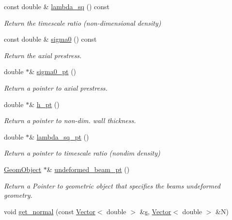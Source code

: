 \begin{DoxyCompactItemize}
const double \& \hyperlink{classoomph_1_1KirchhoffLoveBeamEquations_a8dc173db47158b04c2613b946756a74f}{lambda\+\_\+sq} () const
\begin{DoxyCompactList}\small\item\em Return the timescale ratio (non-\/dimensional density) \end{DoxyCompactList}\item 
const double \& \hyperlink{classoomph_1_1KirchhoffLoveBeamEquations_aa6d1fce06b7f030673fa5dce0f539a72}{sigma0} () const
\begin{DoxyCompactList}\small\item\em Return the axial prestress. \end{DoxyCompactList}\item 
double $\ast$\& \hyperlink{classoomph_1_1KirchhoffLoveBeamEquations_a1aa02dcbcf7a8f278100aa509a1cf4ae}{sigma0\+\_\+pt} ()
\begin{DoxyCompactList}\small\item\em Return a pointer to axial prestress. \end{DoxyCompactList}\item 
double $\ast$\& \hyperlink{classoomph_1_1KirchhoffLoveBeamEquations_a269ed76cccc247c9dfdbe0750b09db3a}{h\+\_\+pt} ()
\begin{DoxyCompactList}\small\item\em Return a pointer to non-\/dim. wall thickness. \end{DoxyCompactList}\item 
double $\ast$\& \hyperlink{classoomph_1_1KirchhoffLoveBeamEquations_a82ef550c7f4237fda4561dee0b20712a}{lambda\+\_\+sq\+\_\+pt} ()
\begin{DoxyCompactList}\small\item\em Return a pointer to timescale ratio (nondim density) \end{DoxyCompactList}\item 
\hyperlink{classoomph_1_1GeomObject}{Geom\+Object} $\ast$\& \hyperlink{classoomph_1_1KirchhoffLoveBeamEquations_ade277069089bd27531bf47caea1cb827}{undeformed\+\_\+beam\+\_\+pt} ()
\begin{DoxyCompactList}\small\item\em Return a Pointer to geometric object that specifies the beam\textquotesingle{}s undeformed geometry. \end{DoxyCompactList}\item 
void \hyperlink{classoomph_1_1KirchhoffLoveBeamEquations_a963a2ffb3c4008e3b9c175fc1d2d94cc}{get\+\_\+normal} (const \hyperlink{classoomph_1_1Vector}{Vector}$<$ double $>$ \&\hyperlink{cfortran_8h_ab7123126e4885ef647dd9c6e3807a21c}{s}, \hyperlink{classoomph_1_1Vector}{Vector}$<$ double $>$ \&N)

\end{DoxyCompactItemize}
